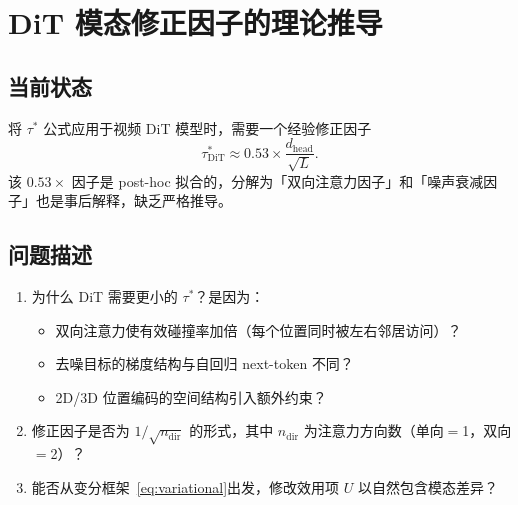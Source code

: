 \documentclass[11pt,a4paper]{article}
\newcommand{\zh}[1]{{\zhfont #1}}
\begin{document}
\section{DiT \zh{模态修正因子的理论推导}}

\subsection*{\zh{当前状态}}
\zh{将} $\tau^*$ \zh{公式应用于视频} DiT \zh{模型时，需要一个经验修正因子}
\begin{equation}
  \tau^*_{\mathrm{DiT}} \approx 0.53 \times \frac{d_{\mathrm{head}}}{\sqrt{L}}.
  \label{eq:dit-correction}
\end{equation}
\zh{该} $0.53\times$ \zh{因子是} post-hoc \zh{拟合的，分解为「双向注意力因子」和「噪声衰减因子」也是事后解释，缺乏严格推导。}

\subsection*{\zh{问题描述}}
\begin{enumerate}[leftmargin=2em]
  \item \zh{为什么} DiT \zh{需要更小的} $\tau^*$\zh{？是因为：}
  \begin{itemize}
    \item \zh{双向注意力使有效碰撞率加倍（每个位置同时被左右邻居访问）？}
    \item \zh{去噪目标的梯度结构与自回归} next-token \zh{不同？}
    \item 2D/3D \zh{位置编码的空间结构引入额外约束？}
  \end{itemize}
  \item \zh{修正因子是否为} $1/\sqrt{n_{\mathrm{dir}}}$ \zh{的形式，其中} $n_{\mathrm{dir}}$ \zh{为注意力方向数（单向}$=$1\zh{，双向}$=$2\zh{）？}
  \item \zh{能否从变分框架~\eqref{eq:variational}出发，修改效用项} $U$ \zh{以自然包含模态差异？}
\end{enumerate}
\end{document}

